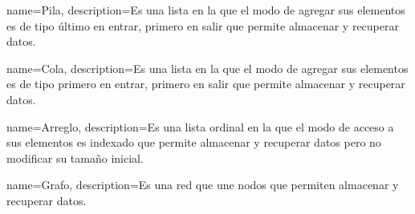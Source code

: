 
{
  name=Pila,
  description={Es una lista en la que el modo de agregar sus elementos es de tipo 
	último en entrar, primero en salir que permite almacenar y recuperar datos.}
}

{
  name=Cola,
  description={Es una lista en la que el modo de agregar sus elementos es de tipo 
	primero en entrar, primero en salir que permite almacenar y recuperar datos.}
}

{
  name=Arreglo,
  description={Es una lista ordinal en la que el modo de acceso a sus elementos 
  es indexado que permite almacenar y recuperar datos pero no modificar su
  tamaño inicial.}
}

{
  name=Grafo,
  description={Es una red que une nodos que permiten almacenar y recuperar datos.}
}
